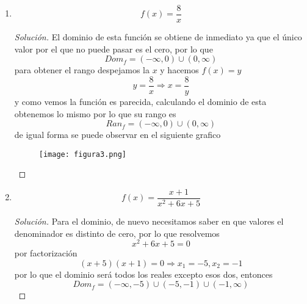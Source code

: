 \documentclass[12pt]{article}
\newenvironment{solution}{\begin{proof}[Solución]}{\end{proof}}
\begin{document}
\begin{enumerate}
\begin{solution}
    \end{solution}
    \item \[f(x) = \frac{8}{x}\]\begin{solution}
        El dominio de esta función se obtiene de inmediato ya que el único valor por el que no puede pasar es el cero, por lo que
        \[Dom_f = (-\infty,0) \cup (0, \infty)\]
        para obtener el rango despejamos la $x$ y hacemos $f(x) = y$
        \[y = \frac{8}{x} \Rightarrow x = \frac{8}{y}\]
        y como vemos la función es parecida, calculando el dominio de esta obtenemos lo mismo por lo que su rango es
        \[Ran_f = (-\infty,0) \cup (0, \infty)\]
        de igual forma se puede observar en el siguiente grafico
        \begin{figure}[H]
            \centering
            \texttt{[image: figura3.png]}
        \end{figure}
    \end{solution}
    \item \[f(x) = \frac{x+1}{x^2+6x+5}\]\begin{solution}
        Para el dominio, de nuevo necesitamos saber en que valores el denominador es distinto de cero, por lo que resolvemos
        \[x^2+6x +5 = 0\] por factorización \[(x+5)(x+1) = 0 \Rightarrow x_1 = -5, x_2 = -1\]
        por lo que el dominio será todos los reales excepto esos dos, entonces
        \[Dom_f = (-\infty, -5) \cup (-5,-1) \cup (-1, \infty)\]
    \end{solution}
\end{enumerate}

\end{document}
